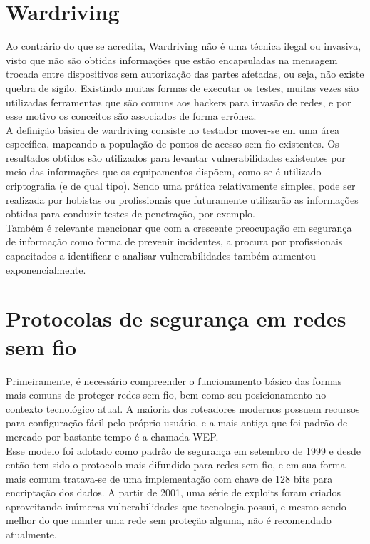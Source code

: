 \documentclass[
	article,			%
	12pt,				%
	oneside,			%
	a4paper,			%
	english,			%
	brazil,				%
	sumario=tradicional
	]{abntex2}
\begin{document}
\section{Wardriving}

Ao contrário do que se acredita, Wardriving não é uma técnica ilegal ou invasiva, visto que não são obtidas informações que estão encapsuladas na mensagem trocada entre dispositivos sem autorização das partes afetadas, ou seja, não existe quebra de sigilo. Existindo muitas formas de executar os testes, muitas vezes são utilizadas ferramentas que são comuns aos hackers para invasão de redes, e por esse motivo os conceitos são associados de forma errônea.\\

A definição básica de wardriving consiste no testador mover-se em uma área específica, mapeando a população de pontos de acesso sem fio existentes. Os resultados obtidos são utilizados para levantar vulnerabilidades existentes por meio das informações que os equipamentos dispõem, como se é utilizado criptografia (e de qual tipo). Sendo uma prática relativamente simples, pode ser realizada por hobistas ou profissionais que futuramente utilizarão as informações obtidas para conduzir testes de penetração, por exemplo.\\

Também é relevante mencionar que com a crescente preocupação em segurança de informação como forma de prevenir incidentes, a procura por profissionais capacitados a identificar e analisar vulnerabilidades também aumentou exponencialmente.

\section{Protocolas de segurança em redes sem fio}

Primeiramente, é necessário compreender o funcionamento básico das formas mais comuns de proteger redes sem fio, bem como seu posicionamento no contexto tecnológico atual. A maioria dos roteadores modernos possuem recursos para configuração fácil pelo próprio usuário, e a mais antiga que foi padrão de mercado por bastante tempo é a chamada WEP.\\

Esse modelo foi adotado como padrão de segurança em setembro de 1999 e desde então tem sido o protocolo mais difundido para redes sem fio, e em sua forma mais comum tratava-se de uma implementação com chave de 128 bits para encriptação dos dados. A partir de 2001, uma série de exploits foram criados aproveitando inúmeras vulnerabilidades que tecnologia possui, e mesmo sendo melhor do que manter uma rede sem proteção alguma, não é recomendado atualmente.\\
\end{document}
